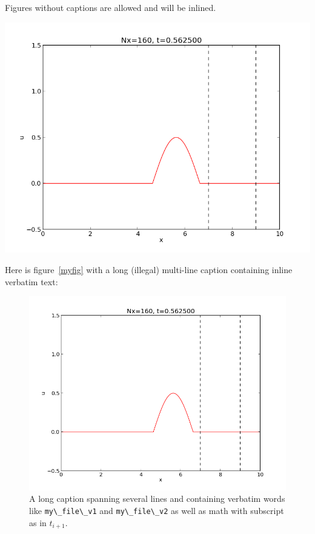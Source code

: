 \documentclass[%
oneside,                 %
final,                   %
10pt]{article}
\theoremstyle{definition}
\begin{document}
\begin{enumerate}
Figures without captions are allowed and will be inlined.

\vspace{6mm}

\centerline{\includegraphics[width=0.9\linewidth]{testfigs/wave1D.png}}

\vspace{6mm}



Here is figure~\vref{myfig} with a long (illegal) multi-line caption
containing inline verbatim text:

\begin{figure}
  \centering
  \includegraphics[width=0.9\linewidth]{testfigs/wave1D.png}
  \caption{
  A long caption spanning several lines and containing verbatim words like \protect \Verb!my\_file\_v1! and \protect \Verb!my\_file\_v2! as well as math with subscript as in $t_{i+1}$. \label{myfig}
  }
\end{figure}


\end{enumerate}
\end{document}
